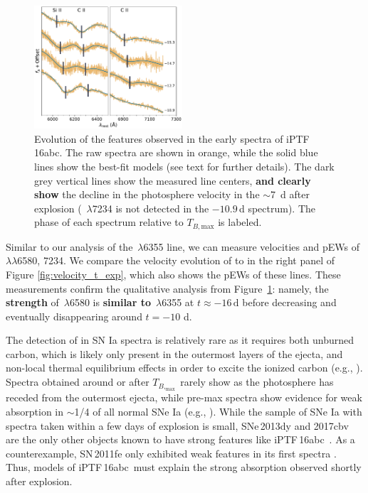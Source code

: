\documentclass[twocolumn]{aastex61}
\newcommand{\abc}{iPTF\,16abc}
\begin{document}
\begin{figure}[]
  \centering
  \includegraphics[width=0.49\textwidth]{CarbonFeature.pdf}
  \caption{
  Evolution of the  features observed in the early spectra of \abc.
  The raw spectra are shown in orange, while the solid blue lines show the
  best-fit models (see text for further details). The dark grey vertical lines
  show the measured line centers, \textbf{and clearly show} the decline in the
  photosphere velocity in the $\sim$7~d after explosion (
  \,$\lambda$7234 is not detected in the $-10.9$\,d spectrum). The
  phase of each spectrum relative to $T_{B,\mathrm{max}}$ is labeled.
  }
  \label{fig:carbon}
\end{figure}

Similar to our analysis of the \,$\lambda$6355 line, we can measure
velocities and pEWs of \,$\lambda\lambda$6580, 7234. We compare the
velocity evolution of  to  in the right panel of Figure
\ref{fig:velocity_t_exp}, which also shows the pEWs of these lines. These
measurements confirm the qualitative analysis from Figure~\ref{fig:carbon}:
namely, the \textbf{strength} of \,$\lambda$6580 is \textbf{similar
to} \,$\lambda$6355 at $t \approx -16 \, \mathrm{d}$ before
decreasing and eventually disappearing around $t = -10$ d.

The detection of  in SN Ia spectra is relatively rare as it requires
both unburned carbon, which is likely only present in the outermost layers of
the ejecta, and non-local thermal equilibrium effects in order to excite the
ionized carbon (e.g., \citealt{2007ApJ...654L..53T}). Spectra obtained around
or after $T_{B,_\mathrm{max}}$ rarely show  as the photosphere has
receded from the outermost ejecta, while pre-max spectra show evidence for
weak  absorption in $\sim$1/4 of all normal SNe Ia (e.g.,
\citealt{2011ApJ...732...30P,2011ApJ...743...27T,2012MNRAS.425.1917S}). While
the sample of SNe Ia with spectra taken within a few days of explosion is
small, SNe\,2013dy and 2017cbv are the only other objects known to have strong
 features like \abc\
\citep{2013ApJ...778L..15Z,2017ApJ...845L..11H}. As a counterexample,
SN\,2011fe only exhibited weak  features in its first spectra
\citep{2012ApJ...752L..26P}. Thus, models of \abc\ must explain the strong
\ion{C}{2} absorption observed shortly after explosion.
\end{document}
